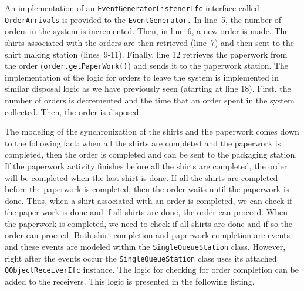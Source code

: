 \documentclass[
]{book}
\theoremstyle{definition}
\theoremstyle{definition}
\theoremstyle{definition}
\theoremstyle{definition}
\theoremstyle{remark}
\begin{document}
An implementation of an \texttt{EventGeneratorListenerIfc} interface called \texttt{OrderArrivals} is provided to
the \texttt{EventGenerator.} In line~5, the number of orders in the system is
incremented. Then, in line~6, a new order is made. The shirts associated
with the orders are then retrieved (line~7) and then sent to the shirt
making station (lines~9-11). Finally, line 12 retrieves the paperwork
from the order (\texttt{order.getPaperWork()}) and sends it to the paperwork
station. The implementation of the logic for orders to leave the system
is implemented in similar disposal logic as we have previously seen
(atarting at line 18). First, the number of orders is decremented and
the time that an order spent in the system collected. Then, the order is
disposed.

The modeling of the synchronization of the shirts and the paperwork
comes down to the following fact: when all the shirts are completed and
the paperwork is completed, then the order is completed and can be sent
to the packaging station. If the paperwork activity finishes before all
the shirts are completed, the order will be completed when the last
shirt is done. If all the shirts are completed before the paperwork is
completed, then the order waits until the paperwork is done. Thus, when
a shirt associated with an order is completed, we can check if the paper
work is done and if all shirts are done, the order can proceed. When the
paperwork is completed, we need to check if all shirts are done and if
so the order can proceed. Both shirt completion and paperwork completion
are events and these events are modeled within the \texttt{SingleQueueStation}
class. However, right after the events occur the \texttt{SingleQueueStation}
class uses its attached \texttt{QObjectReceiverIfc} instance. The logic for
checking for order completion can be added to the receivers. This logic
is presented in the following listing.
\end{document}
